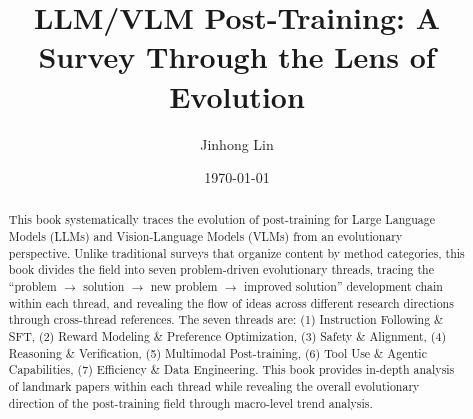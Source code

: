 \documentclass[12pt,a4paper]{article}
\title{\textbf{LLM/VLM Post-Training: A Survey Through the Lens of Evolution}}
\author{Jinhong Lin}
\date{\today}
\begin{document}
\maketitle

\begin{abstract}
This book systematically traces the evolution of post-training for Large Language Models (LLMs) and Vision-Language Models (VLMs) from an evolutionary perspective.
Unlike traditional surveys that organize content by method categories, this book divides the field into seven problem-driven evolutionary threads,
tracing the ``problem $\rightarrow$ solution $\rightarrow$ new problem $\rightarrow$ improved solution'' development chain within each thread,
and revealing the flow of ideas across different research directions through cross-thread references.
The seven threads are:
(1) Instruction Following \& SFT,
(2) Reward Modeling \& Preference Optimization,
(3) Safety \& Alignment,
(4) Reasoning \& Verification,
(5) Multimodal Post-training,
(6) Tool Use \& Agentic Capabilities,
(7) Efficiency \& Data Engineering.
This book provides in-depth analysis of landmark papers within each thread while revealing the overall evolutionary direction of the post-training field through macro-level trend analysis.
\end{abstract}

\tableofcontents
\newpage


\newpage





















\end{document}
